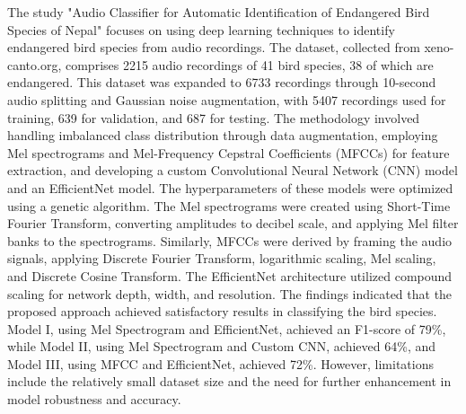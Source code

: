 The study\cite{gautam2023audio} "Audio Classifier for Automatic Identification
of Endangered Bird Species of Nepal" focuses on using deep learning techniques
to identify endangered bird species from audio recordings. The dataset,
collected from xeno-canto.org, comprises 2215 audio recordings of 41 bird
species, 38 of which are endangered. This dataset was expanded to 6733
recordings through 10-second audio splitting and Gaussian noise augmentation,
with 5407 recordings used for training, 639 for validation, and 687 for
testing. The methodology involved handling imbalanced class distribution
through data augmentation, employing Mel spectrograms and Mel-Frequency
Cepstral Coefficients (MFCCs) for feature extraction, and developing a custom
Convolutional Neural Network (CNN) model and an EfficientNet model. The
hyperparameters of these models were optimized using a genetic algorithm. The
Mel spectrograms were created using Short-Time Fourier Transform, converting
amplitudes to decibel scale, and applying Mel filter banks to the spectrograms.
Similarly, MFCCs were derived by framing the audio signals, applying Discrete
Fourier Transform, logarithmic scaling, Mel scaling, and Discrete Cosine
Transform. The EfficientNet architecture utilized compound scaling for network
depth, width, and resolution. The findings indicated that the proposed approach
achieved satisfactory results in classifying the bird species. Model I, using
Mel Spectrogram and EfficientNet, achieved an F1-score of 79\%, while Model II,
using Mel Spectrogram and Custom CNN, achieved 64\%, and Model III, using MFCC
and EfficientNet, achieved 72\%. However, limitations include the relatively
small dataset size and the need for further enhancement in model robustness and
accuracy.


